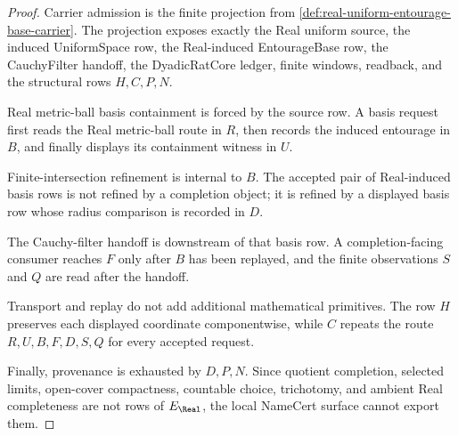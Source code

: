 \begin{proof}
Carrier admission is the finite projection from \autoref{def:real-uniform-entourage-base-carrier}. The projection exposes exactly the Real uniform source, the induced UniformSpace row, the Real-induced EntourageBase row, the CauchyFilter handoff, the DyadicRatCore ledger, finite windows, readback, and the structural rows $H,C,P,N$.

Real metric-ball basis containment is forced by the source row. A basis request first reads the Real metric-ball route in $R$, then records the induced entourage in $B$, and finally displays its containment witness in $U$.

Finite-intersection refinement is internal to $B$. The accepted pair of Real-induced basis rows is not refined by a completion object; it is refined by a displayed basis row whose radius comparison is recorded in $D$.

The Cauchy-filter handoff is downstream of that basis row. A completion-facing consumer reaches $F$ only after $B$ has been replayed, and the finite observations $S$ and $Q$ are read after the handoff.

Transport and replay do not add additional mathematical primitives. The row $H$ preserves each displayed coordinate componentwise, while $C$ repeats the route $R,U,B,F,D,S,Q$ for every accepted request.

Finally, provenance is exhausted by $D,P,N$. Since quotient completion, selected limits, open-cover compactness, countable choice, trichotomy, and ambient Real completeness are not rows of $E_{\Real}$, the local NameCert surface cannot export them.
\end{proof}

